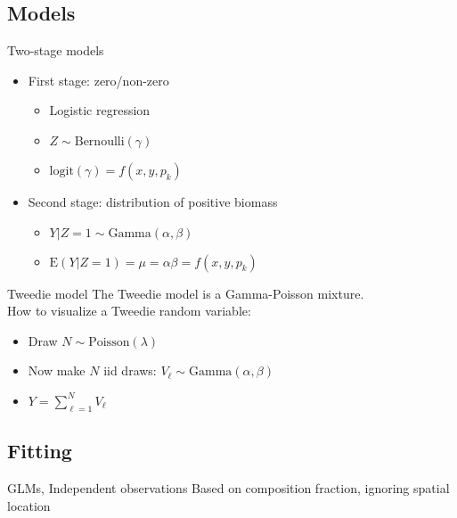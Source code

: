 \documentclass{beamer}
\begin{document}
\subsection{Models}

\begin{frame}[fragile]{Two-stage models}
  \begin{itemize}
    \item First stage: zero/non-zero
    \begin{itemize}
      \item Logistic regression
      \item $Z \sim \text{Bernoulli}(\gamma)$
      \item $\text{logit}(\gamma) = f(x,y,p_k)$
    \end{itemize}
    \item Second stage: distribution of positive biomass
    \begin{itemize}
      \item $Y|Z=1 \sim \text{Gamma}(\alpha, \beta)$
      \item $\text{E}\left(Y|Z=1\right) = \mu = \alpha \beta = f(x,y,p_k)$
    \end{itemize}
  \end{itemize}
\end{frame}


\begin{frame}[fragile]{Tweedie model}
  The Tweedie model is a Gamma-Poisson mixture.\\
  How to visualize a Tweedie random variable:
  \begin{itemize}
    \item Draw $N \sim \text{Poisson}(\lambda)$
    \item Now make $N$ iid draws: $V_{\ell} \sim \text{Gamma}(\alpha, \beta)$
    \item $Y = \sum\limits_{\ell=1}^N  V_{\ell}$
  \end{itemize}
\end{frame}


\subsection{Fitting}

\begin{frame}[fragile]{GLMs, Independent observations}
  Based on composition fraction, ignoring spatial location
\end{frame}
\end{document}
